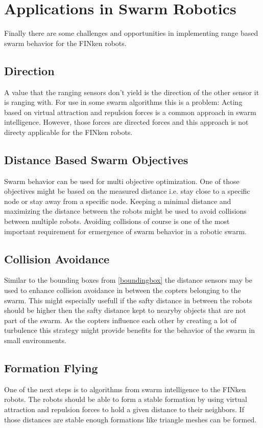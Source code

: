 \section{Applications in Swarm Robotics}

Finally there are some challenges and opportunities in implementing range based swarm behavior for the FINken robots.

\subsection{Direction}
A value that the ranging sensors don't yield is the direction of the other sensor it is ranging with.
For use in some swarm algorithms this is a problem: Acting based on virtual attraction and repulsion forces is a common approach in swarm intelligence.
However, those forces are directed forces and this approach is not directy applicable for the FINken robots.


\subsection{Distance Based Swarm Objectives}
Swarm behavior can be used for multi objective optimization.
One of those objectives might be based on the measured distance i.e. stay close to a specific node or stay away from a specific node.
Keeping a minimal distance and maximizing the distance between the robots might be used to avoid collisions between multiple robots.
Avoiding collisions of course is one of the most important requirement for ermergence of swarm behavior in a robotic swarm.

\subsection{Collision Avoidance}
Similar to the bounding boxes from \autoref{boundingbox} the distance sensors may be used to enhance collision avoidance in between the copters belonging to the swarm.
This might especially usefull if the safty distance in between the robots should be higher then the safty distance kept to nearyby objects that are not part of the swarm.
As the copters influence each other by creating a lot of turbulence this strategy might provide benefits for the behavior of the swarm in small environments.

\subsection{Formation Flying}
One of the next steps is to  algorithms from swarm intelligence to the FINken robots.
The robots should be able to form a stable formation by using virtual attraction and repulsion forces to hold a given distance to their neighbors.
If those distances are stable enough formations like triangle meshes can be formed.

